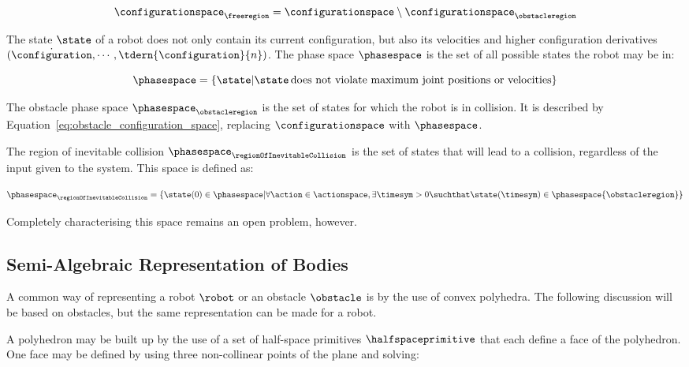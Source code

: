 		\begin{equation}
			\configurationspace_{\freeregion} = \configurationspace \setminus
				\configurationspace_{\obstacleregion}
		\end{equation}

		The state $\state$ of a robot does not only contain its current
		configuration, but also its velocities and higher configuration
		derivatives $(\dot{\configuration},\cdots,\tdern{\configuration}{n})$.
		The phase space $\phasespace$ is the set of all possible states the
		robot may be in:

		\begin{equation}
			\phasespace =
				\left\{%
					\state |
						\state\, \text{does not violate maximum joint positions
						or velocities}
				\right\}
		\end{equation}

		The obstacle phase space $\phasespace_{\obstacleregion}$ is the set of
		states for which the robot is in collision. It is described by
		Equation~\ref{eq:obstacle_configuration_space}, replacing
		$\configurationspace$ with $\phasespace$.

		The region of inevitable collision
		$\phasespace_{\regionOfInevitableCollision}$ is the set of states that
		will lead to a collision, regardless of the input given to the system.
		This space is defined as:

		\begin{equation}
			\phasespace_{\regionOfInevitableCollision} =
				\left\{
					\state(0) \in \phasespace |
						\forall\action\in\actionspace,
							\exists\timesym > 0
					\suchthat
						\state(\timesym) \in \phasespace{\obstacleregion}
				\right\}
		\end{equation}

		Completely characterising this space remains an open problem, however.

	\subsection{Semi-Algebraic Representation of Bodies}%
	\label{sec:semi_algebraic_representation_of_bodies}

		A common way of representing a robot $\robot$ or an obstacle $\obstacle$
		is by the use of convex polyhedra. The following discussion will be
		based on obstacles, but the same representation can be made for a robot.

		A polyhedron may be built up by the use of a set of half-space
		primitives $\halfspaceprimitive$ that each define a face of the
		polyhedron. One face may be defined by using three non-collinear points
		of the plane and solving:

